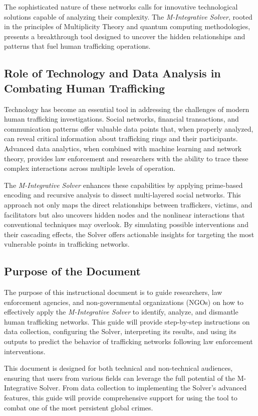 \documentclass[%
 preprint, linenumbers,
 amsmath,amssymb,
 aps, physrev,
]{revtex4-2}
\begin{document}
The sophisticated nature of these networks calls for innovative technological solutions capable of analyzing their complexity. The \textit{M-Integrative Solver}, rooted in the principles of Multiplicity Theory and quantum computing methodologies, presents a breakthrough tool designed to uncover the hidden relationships and patterns that fuel human trafficking operations. 

\subsection{Role of Technology and Data Analysis in Combating Human Trafficking}
Technology has become an essential tool in addressing the challenges of modern human trafficking investigations. Social networks, financial transactions, and communication patterns offer valuable data points that, when properly analyzed, can reveal critical information about trafficking rings and their participants. Advanced data analytics, when combined with machine learning and network theory, provides law enforcement and researchers with the ability to trace these complex interactions across multiple levels of operation.

The \textit{M-Integrative Solver} enhances these capabilities by applying prime-based encoding and recursive analysis to dissect multi-layered social networks. This approach not only maps the direct relationships between traffickers, victims, and facilitators but also uncovers hidden nodes and the nonlinear interactions that conventional techniques may overlook. By simulating possible interventions and their cascading effects, the Solver offers actionable insights for targeting the most vulnerable points in trafficking networks.

\subsection{Purpose of the Document}
The purpose of this instructional document is to guide researchers, law enforcement agencies, and non-governmental organizations (NGOs) on how to effectively apply the \textit{M-Integrative Solver} to identify, analyze, and dismantle human trafficking networks. This guide will provide step-by-step instructions on data collection, configuring the Solver, interpreting its results, and using its outputs to predict the behavior of trafficking networks following law enforcement interventions.

This document is designed for both technical and non-technical audiences, ensuring that users from various fields can leverage the full potential of the M-Integrative Solver. From data collection to implementing the Solver's advanced features, this guide will provide comprehensive support for using the tool to combat one of the most persistent global crimes.
\end{document}
